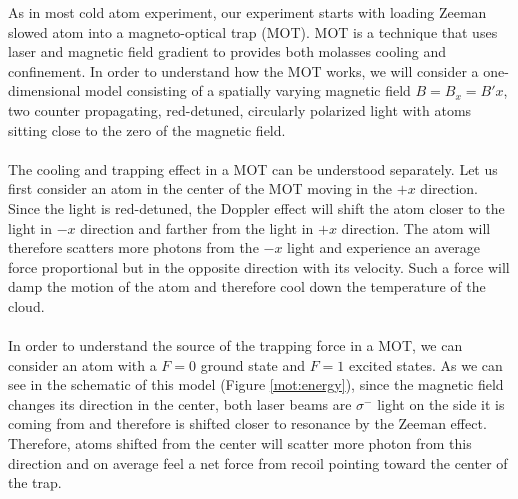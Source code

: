 As in most cold atom experiment, our experiment starts with loading Zeeman slowed atom into a magneto-optical trap (MOT). MOT is a technique that uses laser and magnetic field gradient to provides both molasses cooling and confinement\cite{verenna}. In order to understand how the MOT works, we will consider a one-dimensional model consisting of a spatially varying magnetic field $B=B_x=B'x$, two counter propagating, red-detuned, circularly polarized light with atoms sitting close to the zero of the magnetic field.\\
\\
The cooling and trapping effect in a MOT can be understood separately. Let us first consider an atom in the center of the MOT moving in the $+x$ direction. Since the light is red-detuned, the Doppler effect will shift the atom closer to the light in $-x$ direction and farther from the light in $+x$ direction. The atom will therefore scatters more photons from the $-x$ light and experience an average force proportional but in the opposite direction with its velocity. Such a force will damp the motion of the atom and therefore cool down the temperature of the cloud.\\
\\
In order to understand the source of the trapping force in a MOT, we can consider an atom with a $F=0$ ground state and $F=1$ excited states. As we can see in the schematic of this model (Figure \ref{mot:energy}), since the magnetic field changes its direction in the center, both laser beams are $\sigma^-$ light on the side it is coming from and therefore is shifted closer to resonance by the Zeeman effect. Therefore, atoms shifted from the center will scatter more photon from this direction and on average feel a net force from recoil pointing toward the center of the trap.\\
